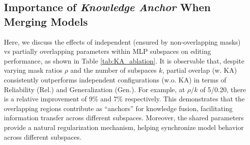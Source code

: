 \documentclass{article}
\begin{document}
\subsection{Importance of \textit{Knowledge Anchor} When Merging Models}\label{app_subsec:knowledge_anchor}

\begin{table}
    \centering
    \vspace{-0.5cm}
    \caption{\small Analysis of Merging \textit{w.o.} and \textit{w.} "knowledge anchor" (KA). $T=1000$. ZsRE. \texttt{LLaMA-2-7B}.}
    \label{tab:KA_ablation}
    \vspace{-0.4cm}
\end{table}

Here, we discuss the effects of independent (ensured by non-overlapping masks) vs partially overlapping parameters within MLP subspaces on editing performance, as shown in Table \ref{tab:KA_ablation}.
It is observable that, despite varying mask ratios \(\rho\) and the number of subspaces \(k\), partial overlap (w. KA) consistently outperforms independent configurations (w.o. KA) in terms of Reliability (Rel.) and Generalization (Gen.). 
For example, at \(\rho/k\) of 5/0.20, there is a relative improvement of 9\% and 7\% respectively.
This demonstrates that the overlapping regions contribute as ``anchors'' for knowledge fusion, facilitating information transfer across different subspaces.
Moreover, the shared parameters provide a natural regularization \cite{subspace_reg} mechanism, helping synchronize model behavior across different subspaces.
\end{document}
